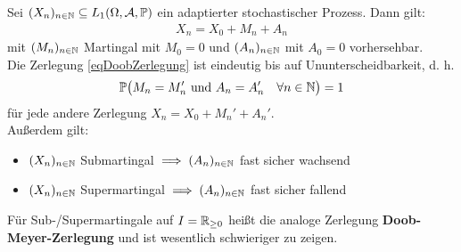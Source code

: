 \begin{theorem}\label{Theorem2.3DoobZerlegung}\enter
	Sei $(X_n)_{n\in\mathbb{N}}\subseteq L_1(\Omega,\mathcal{A},\mathbb{P})$ ein adaptierter stochastischer Prozess. Dann gilt:
	\begin{align}\label{eqDoobZerlegung}\tag{DZ}
		X_n=X_0+M_n+A_n
	\end{align}
	mit $(M_n)_{n\in\mathbb{N}}$ Martingal mit $M_0=0$ und $(A_n)_{n\in\mathbb{N}}$ mit $A_0=0$ vorhersehbar.\\
	Die Zerlegung \eqref{eqDoobZerlegung} ist eindeutig bis auf Ununterscheidbarkeit, d. h.
	\begin{align*}
		\mathbb{P}\big(M_n=M_n'\text{ und }A_n=A_n'\quad\forall n\in\mathbb{N}\big)=1
	\end{align*}
	für jede andere Zerlegung $X_n=X_0+M_n'+A_n'$.\\
	Außerdem gilt:
	\begin{itemize}
		\item $(X_n)_{n\in\mathbb{N}}$ Submartingal $\implies (A_n)_{n\in\mathbb{N}}$ fast sicher wachsend
		\item $(X_n)_{n\in\mathbb{N}}$ Supermartingal $\implies (A_n)_{n\in\mathbb{N}}$ fast sicher fallend
	\end{itemize}
\end{theorem}

\begin{bemerkung}
	Für Sub-/Supermartingale auf $I=\mathbb{R}_{\geq0}$ heißt die analoge Zerlegung \textbf{Doob-Meyer-Zerlegung} und ist wesentlich schwieriger zu zeigen.
\end{bemerkung}

